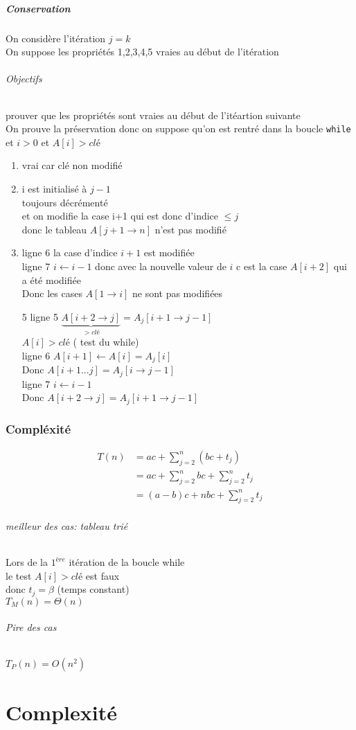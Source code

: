 \documentclass[12pt]{report}
\begin{document}
\paragraph*{Conservation}
On considère l'itération $j = k$\\
On suppose les propriétés 1,2,3,4,5 vraies au début de l'itération\\
\subparagraph*{Objectifs} prouver que les propriétés sont vraies au début de l'itéartion suivante\\
On prouve la préservation donc on suppose qu'on est rentré dans la boucle \verb|while| et $i > 0$ et $A[i] > clé$ 
\begin{enumerate}
 \item vrai car clé non modifié
 \item i est initialisé à $j -1$\\
 toujours décrémenté\\
 et on modifie la case i+1 qui est donc d'indice  $\leq j$\\
 donc le tableau $A[j+1 \to n]$ n'est pas modifié
 \item ligne 6 la case d'indice $i+1$ est modifiée\\
 ligne 7 $i \gets i-1$ donc avec la nouvelle valeur de $i$ c est la case $A[i+2]$ qui a été modifiée \\
 Donc les cases $A[1 \to i]$ ne sont pas modifiées
 \item[5] ligne 5 $\underbrace{A[i+2 \to j]}_{> clé} = A_j[i+1 \to j-1]$\\
 $A[i] > clé$ ( test du while)\\
 ligne 6 $A[i+1] \gets A[i] = A_j[i]$\\
 Donc $A[i+1 ... j] =  A_j [i \to j-1]$\\
 ligne 7 $i \gets i-1$\\
 Donc $A[i+2 \to j ] = A_j[i+1 \to j-1]$ 

\end{enumerate}

\subsection*{Compléxité}

\begin{align*}
T(n)  &= ac + \sum_{j=2}^n (bc +t_j)\\
&= ac + \sum_{j=2}^nbc + \sum_{j=2}^n t_j\\
&= (a-b)c + nbc + \sum_{j=2}^n t_j
\end{align*}

\subparagraph*{meilleur des cas: tableau trié}
Lors de la $1^{ère}$ itération de la boucle while\\
le test $A[i] > clé$ est faux\\
donc $t_j = \beta$ (temps  constant)\\
$T_M(n) =  \Theta(n)$\\

\subparagraph*{Pire des cas}
$T_P(n) = O(n^2)$

\chapter{Complexité}
\end{document}
